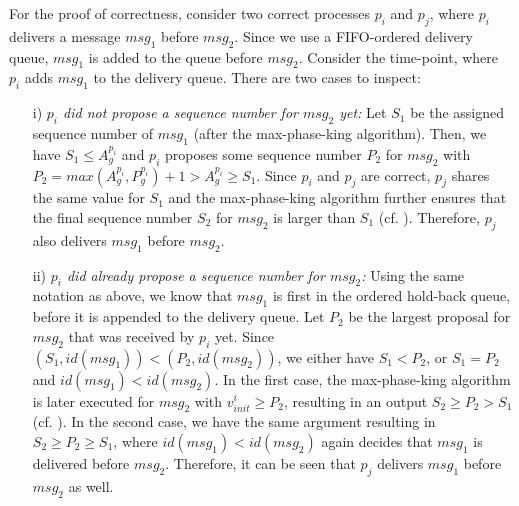 \documentclass[runningheads]{llncs}
\begin{document}
For the proof of correctness, consider two correct processes $p_i$ and $p_j$, where $p_i$ delivers a message $msg_1$ before $msg_2$. Since we use a FIFO-ordered delivery queue, $msg_1$ is added to the queue before $msg_2$. Consider the time-point, where $p_i$ adds $msg_1$ to the delivery queue. There are two cases to inspect:
\begin{enumerate}
    \item[i)] \textit{$p_i$ did not propose a sequence number for $msg_2$ yet:} Let $S_1$ be the assigned sequence number of $msg_1$ (after the max-phase-king algorithm). Then, we have $S_1 \leq A_g^{p_i}$ and $p_i$ proposes some sequence number $P_2$ for $msg_2$ with $P_2 = max(A_g^{p_i}, P_g^{p_i})+1 > A_g^{p_i} \geq S_1$. Since $p_i$ and $p_j$ are correct, $p_j$ shares the same value for $S_1$ and the max-phase-king algorithm further ensures that the final sequence number $S_2$ for $msg_2$ is larger than $S_1$ (cf. ). Therefore, $p_j$ also delivers $msg_1$ before $msg_2$.
    \item[ii)] \textit{$p_i$ did already propose a sequence number for $msg_2$:} Using the same notation as above, we know that $msg_1$ is first in the ordered hold-back queue, before it is appended to the delivery queue. Let $P_2$ be the largest proposal for $msg_2$ that was received by $p_i$ yet. Since $(S_1, id(msg_1)) < (P_2, id(msg_2))$, we either have $S_1 < P_2$, or $S_1 = P_2$ and $id(msg_1) < id(msg_2)$. In the first case, the max-phase-king algorithm is later executed for $msg_2$ with $v_{init}^i \geq P_2$, resulting in an output $S_2 \geq P_2 > S_1$ (cf. ). In the second case, we have the same argument resulting in $S_2 \geq P_2 \geq S_1$, where $id(msg_1) < id(msg_2)$ again decides that $msg_1$ is delivered before $msg_2$. Therefore, it can be seen that $p_j$ delivers $msg_1$ before $msg_2$ as well.
\end{enumerate}
\end{document}

